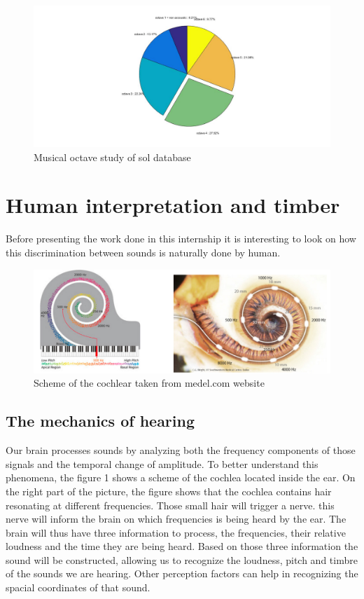 \documentclass[hidelinks,12pt]{report}
\begin{document}
\begin{figure}[t!]
  
  \centering
	    \includegraphics[width=1\textwidth]{byoctave}
    \caption{Musical octave study of sol database}
\end{figure}


\section{Human interpretation and timber}



Before presenting the work done in this internship it is interesting to look on how this discrimination between sounds is naturally done by human.\par
\begin{figure}[t!]
  
  \centering
	    \includegraphics[width=1\textwidth]{cochlear}
    \caption{Scheme of the cochlear taken from medel.com website}
\end{figure}
\subsection{The mechanics of hearing}
Our brain processes sounds by analyzing both the frequency components of those signals and the temporal change of amplitude. To better understand this phenomena, the figure 1 shows a scheme of the cochlea located inside the ear. On the right part of the picture, the figure shows that the cochlea contains hair resonating  at different frequencies. Those small hair will trigger a nerve. this nerve will inform the brain on which frequencies is being heard by the ear. The brain will thus have three information to process, the frequencies, their relative loudness and the time they are being heard. Based on those three information the sound will be constructed, allowing us to
recognize the loudness, pitch and timbre of the sounds we are hearing. Other perception factors can help in recognizing the spacial coordinates   of that sound.
\end{document}
